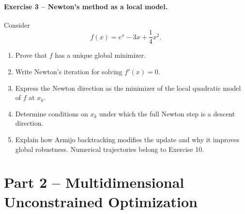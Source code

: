 \documentclass[10pt]{article}
\begin{document}
\paragraph{Exercise 3 -- Newton's method as a local model.}
Consider
\[
f(x)=e^x-3x+\frac14x^2.
\]
\begin{enumerate}
\item Prove that $f$ has a unique global minimizer.
\item Write Newton's iteration for solving $f'(x)=0$.
\item Express the Newton direction as the minimizer of the local quadratic
model of $f$ at $x_k$.
\item Determine conditions on $x_k$ under which the full Newton step is a
descent direction.
\item Explain how Armijo backtracking modifies the update and why it improves
global robustness. Numerical trajectories belong to Exercise 10.
\end{enumerate}

\section{Part 2 -- Multidimensional Unconstrained Optimization}
\end{document}
